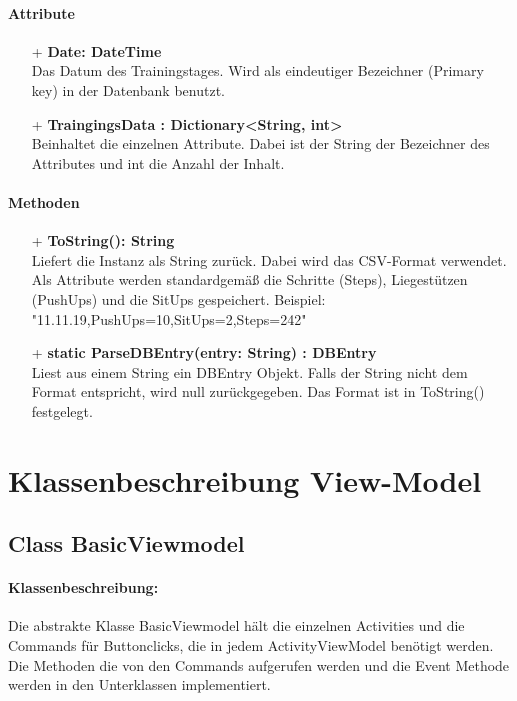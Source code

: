 \documentclass[a4paper,12pt]{article}
\begin{document}
	\paragraph{Attribute}
	\begin{itemize}
		\item[+] \textbf{Date: DateTime}\\Das Datum des Trainingstages. Wird als eindeutiger Bezeichner (Primary key) in der \Gls{Datenbank} benutzt.\\
			\item[+] \textbf{TraingingsData : Dictionary<String, int>}\\ Beinhaltet die einzelnen Attribute. Dabei ist der String der Bezeichner des Attributes und int die Anzahl der Inhalt. 
	\end{itemize}
	 
	 \paragraph{Methoden}
	 \begin{itemize}
	 	\item[+] \textbf{ToString(): String}\\Liefert die Instanz als String zurück. Dabei wird das \gls{CSV}-Format verwendet. Als Attribute werden standardgemäß die Schritte (Steps), Liegestützen (PushUps) und die SitUps gespeichert.
	 	Beispiel: "11.11.19,PushUps=10,SitUps=2,Steps=242"\\
	 	\item[+] \textbf{static ParseDBEntry(entry: String) : DBEntry}\\Liest aus einem String ein DBEntry Objekt. Falls der String nicht dem Format entspricht, wird null zurückgegeben. Das Format ist in ToString() festgelegt.\\
	\end{itemize}











\section{Klassenbeschreibung View-Model}
\subsection{Class BasicViewmodel} %
\paragraph{Klassenbeschreibung:}
Die abstrakte Klasse BasicViewmodel hält die einzelnen Activities und die Commands für Buttonclicks, die in jedem ActivityViewModel benötigt werden. Die Methoden die von den Commands aufgerufen werden und die Event Methode werden in den Unterklassen implementiert. 
\end{document}
